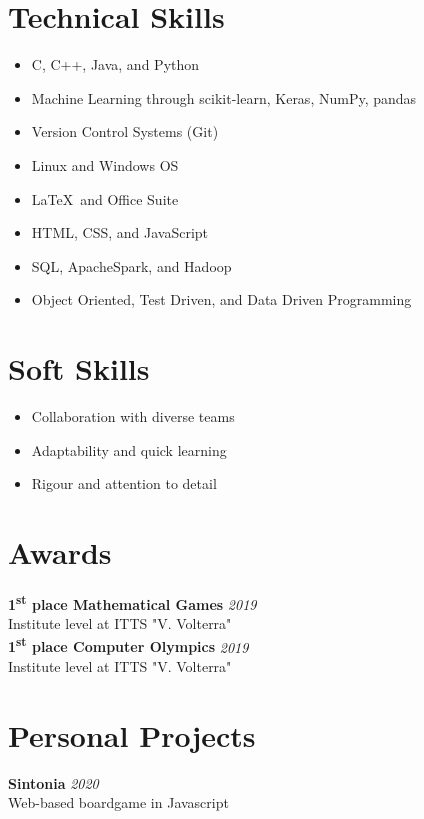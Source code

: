 \documentclass[a4paper,10pt]{article}
\begin{document}
\begin{minipage}[t]{0.33\textwidth}
    \section*{Technical Skills}
    \begin{itemize}[left=0.2cm, label={\textbullet}]
        \item C, C++, Java, and Python
        \item Machine Learning through scikit-learn, Keras, NumPy, pandas
        \item Version Control Systems (Git)
        \item Linux and Windows OS
        \item \LaTeX \, and Office Suite
        \item HTML, CSS, and JavaScript
        \item SQL, ApacheSpark, and Hadoop
        \item Object Oriented, Test Driven, and Data Driven Programming
    \end{itemize}

    \section*{Soft Skills}
    \begin{itemize}[left=0.2cm, label={\textbullet}]
        \item Collaboration with diverse teams
        \item Adaptability and quick learning
        \item Rigour and attention to detail
    \end{itemize}

    \section*{Awards}
        \textbf{1\textsuperscript{st} place Mathematical Games} \hfill \textit{2019} \\ Institute level at ITTS "V. Volterra" \\

        \textbf{1\textsuperscript{st} place Computer Olympics} \hfill \textit{2019} \\ Institute level at ITTS "V. Volterra"

    \section*{Personal Projects}
        \textbf{Sintonia} \hfill \textit{2020} \\
        Web-based boardgame in Javascript \\


\end{minipage}
\end{document}
